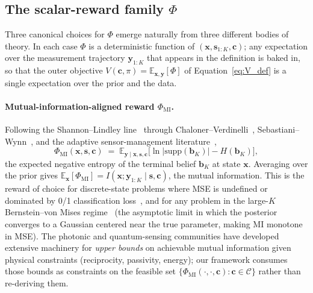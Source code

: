 \documentclass[11pt,a4paper,onecolumn]{article}
\newcommand{\E}{\mathbb{E}}
\newcommand{\bb}{\bm{b}}
\newcommand{\bx}{\bm{x}}
\newcommand{\bc}{\bm{c}}
\newcommand{\bs}{\bm{s}}
\newcommand{\by}{\bm{y}}
\begin{document}
\subsection{The scalar-reward family $\Phi$}
\label{sec:phi_family}

Three canonical choices for $\Phi$ emerge naturally from three different bodies of theory.  In each case $\Phi$ is a deterministic function of $(\bx, \bs_{1:K}, \bc)$; any expectation over the measurement trajectory $\by_{1:K}$ that appears in the definition is baked in, so that the outer objective $V(\bc, \pi) = \E_{\bx, \by}[\Phi]$ of Equation~\eqref{eq:V_def} is a single expectation over the prior and the data.

\paragraph{Mutual-information-aligned reward $\Phi_{\text{MI}}$.}  Following the Shannon--Lindley line~\cite{shannon1948mathematical, lindley1956measure} through Chaloner--Verdinelli~\cite{chaloner1995bayesian}, Sebastiani--Wynn~\cite{sebastiani2000optimal}, and the adaptive sensor-management literature~\cite{kreucher2005kastella, hero2011survey},
\begin{equation}
  \Phi_{\text{MI}}(\bx, \bs, \bc) \;=\; \E_{\by\mid\bx, \bs, \bc}\!\bigl[\ln|\mathrm{supp}(\bb_K)| - H(\bb_K)\bigr],
\end{equation}
the expected negative entropy of the terminal belief $\bb_K$ at state $\bx$.  Averaging over the prior gives $\E_{\bx}[\Phi_{\text{MI}}] = I(\bx; \by_{1:K} \mid \bs, \bc)$, the mutual information.  This is the reward of choice for discrete-state problems where MSE is undefined or dominated by 0/1 classification loss~\cite{castanon2008stochastic}, and for any problem in the large-$K$ Bernstein--von Mises regime~\cite{vaart2000asymptotic, clark2021bvm} (the asymptotic limit in which the posterior converges to a Gaussian centered near the true parameter, making MI monotone in MSE).  The photonic and quantum-sensing communities have developed extensive machinery for \emph{upper bounds} on achievable mutual information given physical constraints (reciprocity, passivity, energy); our framework consumes those bounds as constraints on the feasible set $\{\Phi_{\text{MI}}(\cdot, \cdot, \bc) : \bc \in \mathcal{C}\}$ rather than re-deriving them.
\end{document}
